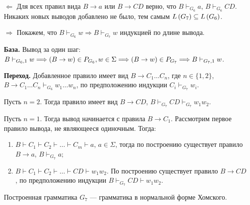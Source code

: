 \begin{itemize}
$\Leftarrow$ Для всех правил вида $B \rightarrow a$ или $B \rightarrow CD$ верно, что $B \vdash_{G_6} a$, $B \vdash_{G_6} CD$. Никаких новых выводов добавлено не было, тем самым $L \left({G_7}\right) \subseteq L \left({G_6}\right)$.

$\Rightarrow$ Покажем, что $B \vdash_{G_6} w \Rightarrow B \vdash_{G_7} w$ индукцией по длине вывода.

\textbf{База.} Вывод за один шаг: $B \vdash_{G_6, 1} w \Longrightarrow \left({B \rightarrow w}\right) \in P_{G_6}, w \in \Sigma \Longrightarrow \left({B \rightarrow w}\right) \in P_{G_7} \Longrightarrow B \vdash_{G_7,1} w$.

\textbf{Переход.} Добавленное правило имеет вид $B \rightarrow C_1 \dots C_n$, где $n \in \{  1, 2\}$, $B \rightarrow C_1 \dots C_n \vdash_{G_6} w_1 \dots w_n$, по предположению индукции $C_i \vdash_{G_7} w_i$.

Пусть $n = 2$. Тогда правило имеет вид $B \rightarrow CD$, $B \vdash_{G_7} CD \vdash_{G_7} w_1 w_2$.

Пусть $n = 1$. Тогда вывод начинается с правила $B \rightarrow C_1$. Рассмотрим первое правило вывода, не являющееся одиночным. Тогда:

\begin{enumerate}
    \item $B \vdash C_1 \vdash C_2 \vdash \dots \vdash C_m \vdash a$, $a \in \Sigma$, тогда по построению существует правило $B \rightarrow a$, $B \vdash_{G_7} a$;
    \item $B \vdash C_1 \vdash C_2 \vdash \dots \vdash CD \vdash w_1 w_2$. По построению существует правило $B \rightarrow CD$, по предположению индукции $B \vdash_{G_7} CD \vdash w_1 w_2$.
\end{enumerate}

Построенная грамматика $G_7$ — грамматика в нормальной форме Хомского.

\end{itemize}
